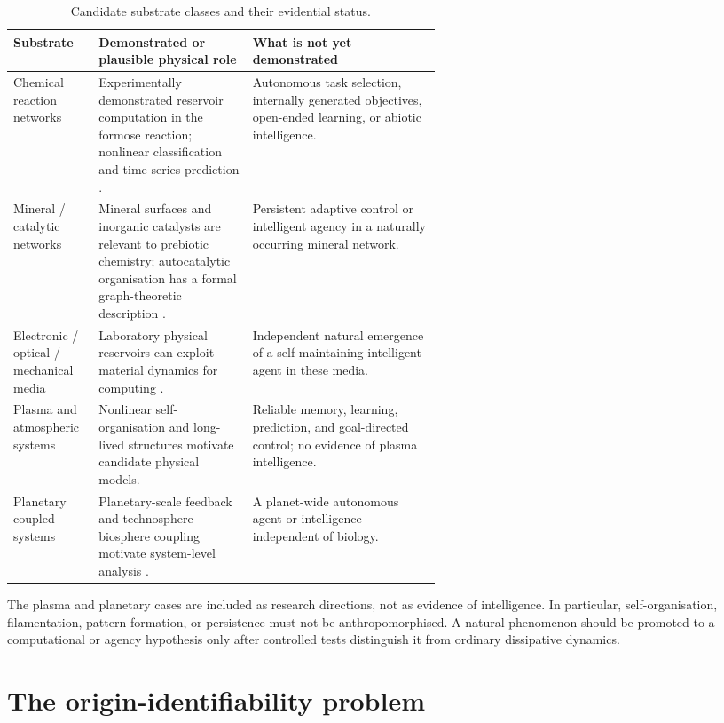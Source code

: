 \documentclass[11pt]{article}
\begin{document}
\begin{table}[H]
\centering\small
\caption{Candidate substrate classes and their evidential status.}
\label{tab:substrates}
\begin{tabularx}{\linewidth}{p{0.20\linewidth}p{0.36\linewidth}X}
\toprule
Substrate & Demonstrated or plausible physical role & What is not yet demonstrated \\
\midrule
Chemical reaction networks & Experimentally demonstrated reservoir computation in the formose reaction; nonlinear classification and time-series prediction \citep{Baltussen2024}. & Autonomous task selection, internally generated objectives, open-ended learning, or abiotic intelligence. \\
Mineral / catalytic networks & Mineral surfaces and inorganic catalysts are relevant to prebiotic chemistry; autocatalytic organisation has a formal graph-theoretic description \citep{HordijkSteel2018}. & Persistent adaptive control or intelligent agency in a naturally occurring mineral network. \\
Electronic / optical / mechanical media & Laboratory physical reservoirs can exploit material dynamics for computing \citep{Stepney2024}. & Independent natural emergence of a self-maintaining intelligent agent in these media. \\
Plasma and atmospheric systems & Nonlinear self-organisation and long-lived structures motivate candidate physical models. & Reliable memory, learning, prediction, and goal-directed control; no evidence of plasma intelligence. \\
Planetary coupled systems & Planetary-scale feedback and technosphere-biosphere coupling motivate system-level analysis \citep{Frank2022}. & A planet-wide autonomous agent or intelligence independent of biology. \\
\bottomrule
\end{tabularx}
\end{table}

The plasma and planetary cases are included as research directions, not as evidence of intelligence. In particular, self-organisation, filamentation, pattern formation, or persistence must not be anthropomorphised. A natural phenomenon should be promoted to a computational or agency hypothesis only after controlled tests distinguish it from ordinary dissipative dynamics.

\section{The origin-identifiability problem}
\end{document}
